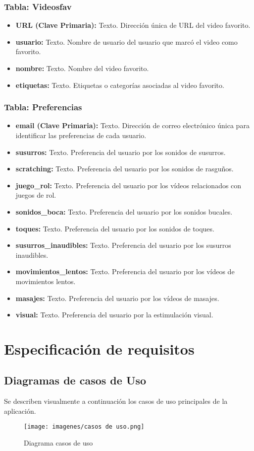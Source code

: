 \documentclass[a4paper,12pt,twoside]{memoir}
\newcommand{\apendice}[1]{
	\chapter{#1}
}
\begin{document}
\subsection*{Tabla: Videosfav}
\begin{itemize}
  \item \textbf{URL (Clave Primaria):} Texto. Dirección única de URL del video favorito.
  \item \textbf{usuario:} Texto. Nombre de usuario del usuario que marcó el video como favorito.
  \item \textbf{nombre:} Texto. Nombre del video favorito.
  \item \textbf{etiquetas:} Texto. Etiquetas o categorías asociadas al video favorito.
\end{itemize}

\subsection*{Tabla: Preferencias}
\begin{itemize}
  \item \textbf{email (Clave Primaria):} Texto. Dirección de correo electrónico única para identificar las preferencias de cada usuario.
  \item \textbf{susurros:} Texto. Preferencia del usuario por los sonidos de susurros.
  \item \textbf{scratching:} Texto. Preferencia del usuario por los sonidos de rasguños.
  \item \textbf{juego\_rol:} Texto. Preferencia del usuario por los vídeos relacionados con juegos de rol.
  \item \textbf{sonidos\_boca:} Texto. Preferencia del usuario por los sonidos bucales.
  \item \textbf{toques:} Texto. Preferencia del usuario por los sonidos de toques.
  \item \textbf{susurros\_inaudibles:} Texto. Preferencia del usuario por los susurros inaudibles.
  \item \textbf{movimientos\_lentos:} Texto. Preferencia del usuario por los vídeos de movimientos lentos.
  \item \textbf{masajes:} Texto. Preferencia del usuario por los vídeos de masajes.
  \item \textbf{visual:} Texto. Preferencia del usuario por la estimulación visual.
\end{itemize}

\apendice{Especificación de requisitos}
\section{Diagramas de casos de Uso}
Se describen visualmente a continuación los casos de uso principales de la aplicación.
\begin{figure}
    \centering
    \texttt{[image: imagenes/casos de uso.png]}
    \caption{Diagrama casos de uso}
    \label{fig:enter-label}
\end{figure}
\end{document}
